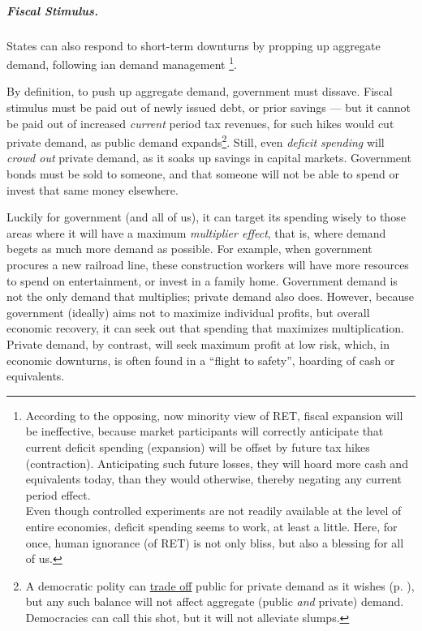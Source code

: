 \subparagraph{Fiscal Stimulus.}  \label{sec:fiscal_stimulus}
States can also respond to short-term downturns by propping up aggregate demand, following \citeauthor{Keynes1936}ian demand management \footnote{
	According to the opposing, now minority view of \gls{RET}, fiscal expansion will be ineffective, because market participants will correctly anticipate that current deficit spending (expansion) will be offset by future tax hikes (contraction). Anticipating such future losses, they will hoard more cash and equivalents today, than they would otherwise, thereby negating any current period effect.\\ Even though controlled experiments are not readily available at the level of entire economies, deficit spending seems to work, at least a little. Here, for once, human ignorance (of \gls{RET}) is not only bliss, but also a blessing for all of us.}.

By definition, to push up aggregate demand, government must dissave. Fiscal stimulus must be paid out of newly issued debt, or prior savings --- but it cannot be paid out of increased \emph{current} period tax revenues, for such hikes would cut private demand, as public demand expands\footnote{
	A democratic polity can \hyperref[sec:tradeoffs]{trade off} public for private demand as it wishes (p. \pageref{sec:tradeoffs}), but any such balance will not affect aggregate (public \emph{and} private) demand. Democracies can call this shot, but it will not alleviate slumps.}. 
Still, even \emph{deficit spending} will \emph{crowd out} private demand, as it soaks up savings in capital markets. Government bonds must be sold to someone, and that someone will not be able to spend or invest that same money elsewhere.

Luckily for government (and all of us), it can target its spending wisely to those areas where it will have a maximum \emph{multiplier effect}, that is, where demand begets as much more demand as possible. For example, when government procures a new railroad line, these construction workers will have more resources to spend on entertainment, or invest in a family home. Government demand is not the only demand that multiplies; private demand also does. However, because government (ideally) aims not to maximize individual profits, but overall economic recovery, it can seek out that spending that maximizes multiplication. Private demand, by contrast, will seek maximum profit at low risk, which, in economic downturns, is often found in a ``flight to safety'', hoarding of cash or equivalents.

